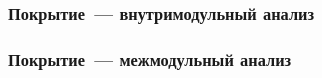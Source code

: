 \documentclass[14pt]{beamer}
\begin{document}
\begin{frame}
\frametitle{Покрытие~--- внутримодульный анализ}
\begin{figure}[h]
\end{figure}
\end{frame}

\begin{frame}
\frametitle{Покрытие~--- межмодульный анализ}
\begin{figure}[h]
\end{figure}
\end{frame}
\end{document}

